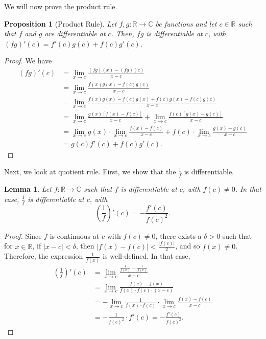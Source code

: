 \documentclass[a4paper, openany]{memoir}
\theoremstyle{definition}
\theoremstyle{plain}
\newtheorem{lemma}[definition]{Lemma}
\newtheorem{proposition}[definition]{Proposition}
\begin{document}
We will now prove the product rule.
\begin{proposition}[Product Rule]
Let $f, g: \mathbb{R} \to \mathbb{C}$ be functions and let $c \in \mathbb{R}$ such that $f$ and $g$ are differentiable at $c$. Then, $fg$ is differentiable at $c$, with $(fg)'(c) = f'(c) g(c) + f(c) g'(c)$.
\end{proposition}
\begin{proof}
We have
\begin{align*}
    (fg)'(c) &= \lim_{x \to c} \frac{(fg)(x) - (fg)(c)}{x - c} \\
    &= \lim_{x \to c} \frac{f(x) g(x) - f(c) g(c)}{x - c} \\
    &= \lim_{x \to c} \frac{f(x) g(x) - f(c) g(x) + f(c) g(x) - f(c) g(c)}{x - c} \\
    &= \lim_{x \to c} \frac{g(x) [f(x) - f(c)]}{x - c} + \lim_{x \to c} \frac{f(c) [g(x) - g(c)]}{x - c} \\
    &= \lim_{x \to c} g(x) \cdot \lim_{x \to c} \frac{f(x) - f(c)}{x - c} + f(c) \cdot \lim_{x \to c} \frac{g(x) - g(c)}{x - c} \\
    &= g(c) f'(c) + f(c) g'(c).
\end{align*}
\end{proof}
\noindent Next, we look at quotient rule. First, we show that the $\frac{1}{f}$ is differentiable.
\begin{lemma}
Let $f: \mathbb{R} \to \mathbb{C}$ such that $f$ is differentiable at $c$, with $f(c) \neq 0$. In that case, $\frac{1}{f}$ is differentiable at $c$, with
\[\left(\frac{1}{f}\right)'(c) = -\frac{f'(c)}{f(c)^2}.\]
\end{lemma}
\begin{proof}
Since $f$ is continuous at $c$ with $f(c) \neq 0$, there exists a $\delta > 0$ such that for $x \in \mathbb{R}$, if $|x - c| < \delta$, then $|f(x) - f(c)| < \frac{|f(c)|}{2}$, and so $f(x) \neq 0$. Therefore, the expression $\frac{1}{f(x)}$ is well-defined. In that case,
\begin{align*}
    \left(\frac{1}{f}\right)'(c) &= \lim_{x \to c} \frac{\frac{1}{f(x)} - \frac{1}{f(c)}}{x - c} \\
    &= \lim_{x \to c} \frac{f(c) - f(x)}{f(x) \cdot f(c) \cdot (x - c)} \\
    &= -\lim_{x \to c} \frac{1}{f(x) \cdot f(c)} \cdot \lim_{x \to c} \frac{f(x) - f(c)}{x - c} \\
    &= -\frac{1}{f(c)^2} \cdot f'(c) = -\frac{f'(c)}{f(c)^2}.
\end{align*}
\end{proof}
\end{document}
